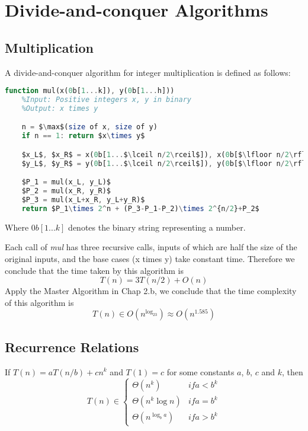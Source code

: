 \section{Divide-and-conquer Algorithms}

\subsection{Multiplication}

\begin{definition}
A divide-and-conquer algorithm for integer multiplication is defined as follows:
\begin{lstlisting}[mathescape=true, language=Octave]
function mul(x(0b[1...k]), y(0b[1...h]))
	%Input: Positive integers x, y in binary
	%Output: x times y

	n = $\max$(size of x, size of y)
	if n == 1: return $x\times y$

	$x_L$, $x_R$ = x(0b[1...$\lceil n/2\rceil$]), x(0b[$\lfloor n/2\rfloor$...n])
	$y_L$, $y_R$ = y(0b[1...$\lceil n/2\rceil$]), y(0b[$\lfloor n/2\rfloor$...n])

	$P_1 = mul(x_L, y_L)$
	$P_2 = mul(x_R, y_R)$
	$P_3 = mul(x_L+x_R, y_L+y_R)$
	return $P_1\times 2^n + (P_3-P_1-P_2)\times 2^{n/2}+P_2$
\end{lstlisting}
Where $0b[1...k]$ denotes the binary string representing a number.
\end{definition}
Each call of \textit{mul} has three recursive calls, inputs of which are half the size of the original inputs, and the base cases (x times y) take constant time. Therefore we conclude that the time taken by this algorithm is
\[
T(n) = 3T(n/2)+O(n)
\]
Apply the Master Algorithm in Chap 2.b, we conclude that the time complexity of this algorithm is
\[
T(n) \in O(n^{\log_23}) \approx O(n^{1.585})
\]

\subsection{Recurrence Relations}

\begin{theorem}
If $T(n) = aT(n/b) + cn^k$ and $T(1) = c$ for some constants $a$, $b$, $c$ and $k$, then
\begin{equation*}
T(n) \in \begin{cases}
\Theta(n^k) &if a<b^k \\
\Theta(n^k\log n) &if a=b^k \\
\Theta(n^{\log_ba}) &if a>b^k
\end{cases}
\end{equation*}
\end{theorem}

